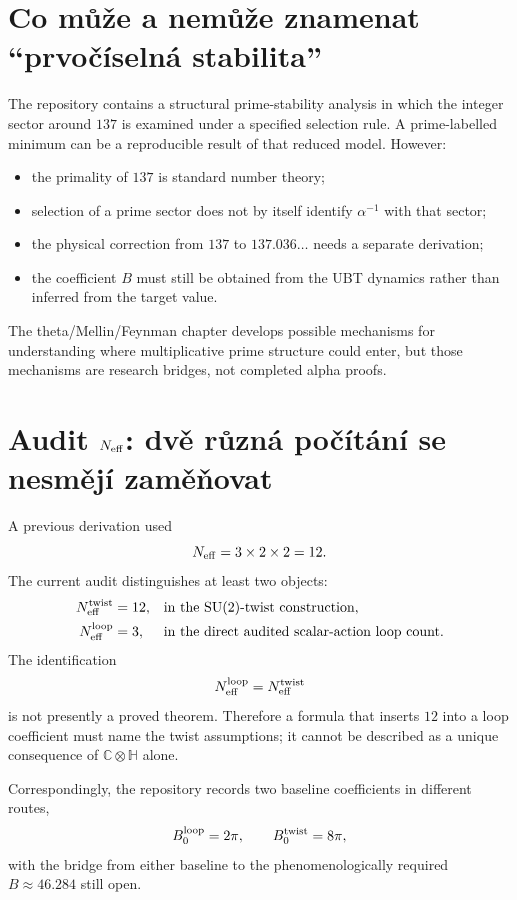\section{Co může a nemůže znamenat ``prvočíselná stabilita''}
The repository contains a structural prime-stability analysis in which the
integer sector around $137$ is examined under a specified selection rule.  A
prime-labelled minimum can be a reproducible result of that reduced model.
However:
\begin{itemize}
 \item the primality of $137$ is standard number theory;
 \item selection of a prime sector does not by itself identify
       $\alpha^{-1}$ with that sector;
 \item the physical correction from $137$ to $137.036\ldots$ needs a separate
       derivation;
 \item the coefficient $B$ must still be obtained from the UBT dynamics rather
       than inferred from the target value.
\end{itemize}
The theta/Mellin/Feynman chapter develops possible mechanisms for understanding
where multiplicative prime structure could enter, but those mechanisms are
research bridges, not completed alpha proofs.

\section{Audit \(N_{\rm eff}\): dvě různá počítání se nesmějí zaměňovat}
A previous derivation used
\[
 N_{\rm eff}=3\times2\times2=12.
\]
The current audit distinguishes at least two objects:
\begin{align*}
 N_{\rm eff}^{\rm twist}&=12,
 &&\text{in the SU(2)-twist construction},\\
 N_{\rm eff}^{\rm loop}&=3,
 &&\text{in the direct audited scalar-action loop count}.
\end{align*}
The identification
\[
 N_{\rm eff}^{\rm loop}=N_{\rm eff}^{\rm twist}
\]
is not presently a proved theorem.  Therefore a formula that inserts $12$ into
a loop coefficient must name the twist assumptions; it cannot be described as
a unique consequence of $\mathbb C\otimes\mathbb H$ alone.

Correspondingly, the repository records two baseline coefficients in different
routes,
\[
 B_0^{\rm loop}=2\pi,
 \qquad
 B_0^{\rm twist}=8\pi,
\]
with the bridge from either baseline to the phenomenologically required
$B\approx46.284$ still open.

